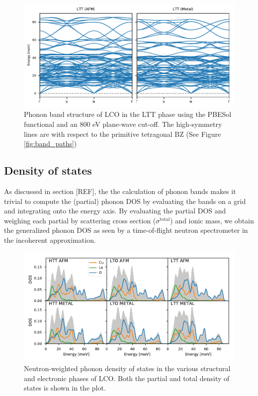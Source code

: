 \begin{figure}
	\centering
	\includegraphics[width=\textwidth]{fig/simulation/ltt_bands.pdf}
	\caption[LTT Bands]{Phonon band structure of LCO in the LTT phase using the PBESol functional and an 800 eV plane-wave cut-off. The high-symmetry lines are with respect to the primitive tetragonal BZ (See Figure \ref{fig:band_paths})}
	\label{fig:ltt_bands}
\end{figure}

\subsection{Density of states}\label{sec:sim_dos}
As discussed in section [REF], the the calculation of phonon bands makes it trivial to compute the (partial) phonon DOS by evaluating the bands on a grid and integrating onto the energy axis. By evaluating the partial DOS and weighing each partial by scattering cross section ($\sigma^\text{total}$) and ionic mass, we obtain the generalized phonon DOS as seen by a time-of-flight neutron spectrometer in the incoherent approximation. 

\begin{figure}
	\centering
	\includegraphics[width=\textwidth]{fig/simulation/phonopy_pdos.pdf}
	\caption[Neutron DOS (frozen-phonons)]{Neutron-weighted phonon density of states in the various structural and electronic phases of LCO. Both the partial and total density of states is shown in the plot.}
	\label{fig:dos_all}
\end{figure}


